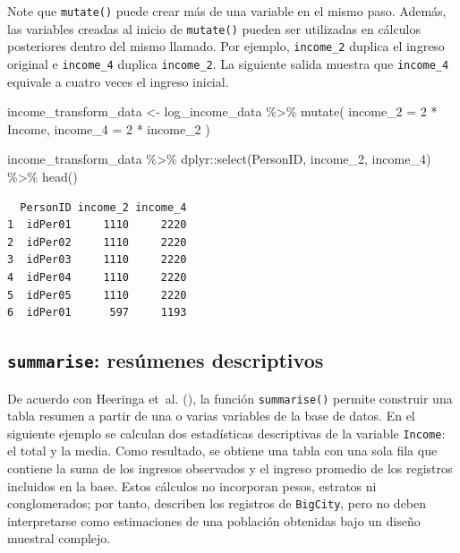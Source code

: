 \documentclass[
  spanish,
  11pt,
  letterpaper,
  oneside,
  open=any]{scrbook}
\newenvironment{Shaded}{\begin{snugshade}}{\end{snugshade}}
\newcommand{\AttributeTok}[1]{\textcolor[rgb]{0.40,0.45,0.13}{#1}}
\newcommand{\DecValTok}[1]{\textcolor[rgb]{0.68,0.00,0.00}{#1}}
\newcommand{\FunctionTok}[1]{\textcolor[rgb]{0.28,0.35,0.67}{#1}}
\newcommand{\NormalTok}[1]{\textcolor[rgb]{0.00,0.23,0.31}{#1}}
\newcommand{\OtherTok}[1]{\textcolor[rgb]{0.00,0.23,0.31}{#1}}
\newcommand{\SpecialCharTok}[1]{\textcolor[rgb]{0.37,0.37,0.37}{#1}}
\begin{document}
Note que \texttt{mutate()} puede crear más de una variable en el mismo
paso. Además, las variables creadas al inicio de \texttt{mutate()}
pueden ser utilizadas en cálculos posteriores dentro del mismo llamado.
Por ejemplo, \texttt{income\_2} duplica el ingreso original e
\texttt{income\_4} duplica \texttt{income\_2}. La siguiente salida
muestra que \texttt{income\_4} equivale a cuatro veces el ingreso
inicial.

\begin{Shaded}
\begin{Highlighting}[]
\NormalTok{income\_transform\_data }\OtherTok{\textless{}{-}}\NormalTok{ log\_income\_data }\SpecialCharTok{\%\textgreater{}\%}
  \FunctionTok{mutate}\NormalTok{(}
    \AttributeTok{income\_2 =} \DecValTok{2} \SpecialCharTok{*}\NormalTok{ Income,}
    \AttributeTok{income\_4 =} \DecValTok{2} \SpecialCharTok{*}\NormalTok{ income\_2}
\NormalTok{  )}

\NormalTok{income\_transform\_data }\SpecialCharTok{\%\textgreater{}\%}
\NormalTok{  dplyr}\SpecialCharTok{::}\FunctionTok{select}\NormalTok{(PersonID, income\_2, income\_4) }\SpecialCharTok{\%\textgreater{}\%}
  \FunctionTok{head}\NormalTok{()}
\end{Highlighting}
\end{Shaded}

\begin{verbatim}
  PersonID income_2 income_4
1  idPer01     1110     2220
2  idPer02     1110     2220
3  idPer03     1110     2220
4  idPer04     1110     2220
5  idPer05     1110     2220
6  idPer01      597     1193
\end{verbatim}

\subsection{\texorpdfstring{\texttt{summarise}: resúmenes
descriptivos}{summarise: resúmenes descriptivos}}\label{summarise-resumenes-descriptivos}

De acuerdo con Heeringa et~al.
(), la función
\texttt{summarise()} permite construir una tabla resumen a partir de una
o varias variables de la base de datos. En el siguiente ejemplo se
calculan dos estadísticas descriptivas de la variable \texttt{Income}:
el total y la media. Como resultado, se obtiene una tabla con una sola
fila que contiene la suma de los ingresos observados y el ingreso
promedio de los registros incluidos en la base. Estos cálculos no
incorporan pesos, estratos ni conglomerados; por tanto, describen los
registros de \texttt{BigCity}, pero no deben interpretarse como
estimaciones de una población obtenidas bajo un diseño muestral
complejo.
\end{document}
